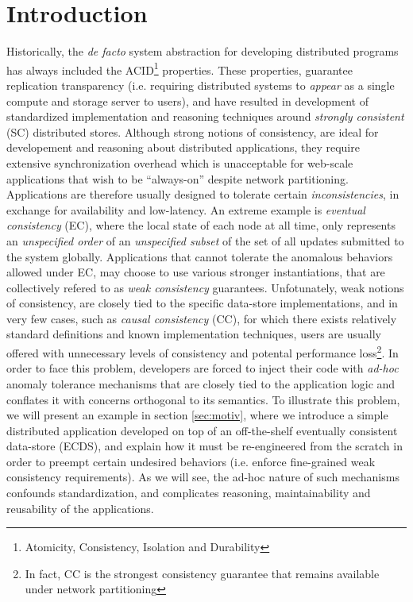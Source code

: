 \section{Introduction}
\label{sec:intro}
Historically,
the \emph{de facto} system abstraction for developing distributed
programs has always included the 
ACID\footnote{Atomicity, Consistency, Isolation and
Durability} properties.
These properties, guarantee replication transparency  (i.e. requiring distributed
systems to \emph{appear} as a single compute and storage server to
users), and have resulted in development of standardized implementation and
reasoning techniques around \emph{strongly consistent} (SC) distributed
stores.
Although strong notions of consistency, are ideal for developement and
reasoning about distributed applications, 
they require extensive synchronization overhead which is unacceptable
for web-scale applications that wish to be ``always-on'' despite network
partitioning. Applications are therefore usually designed to tolerate
certain \emph{inconsistencies}, in exchange for availability and
low-latency. 
An extreme example is \emph{eventual consistency} (EC), where
the local state of each node at all time,
only represents an \emph{unspecified order} of an \emph{unspecified
subset} of the set of all updates submitted to the system globally.
Applications that  cannot tolerate the anomalous behaviors allowed under
EC, may choose to use various stronger instantiations, that are
collectively refered to as \emph{weak consistency} guarantees. 
Unfotunately, weak notions of consistency, are closely tied to the 
specific data-store implementations, and in very few cases, such as 
\emph{causal consistency} (CC), for which there exists
relatively standard definitions and known implementation techniques,
users are usually offered with unnecessary levels of consistency and potental
performance loss\footnote{In fact, CC is the
strongest consistency guarantee that remains available under network
partitioning}. In order to face this problem, developers are forced to
inject their code with \emph{ad-hoc} anomaly tolerance mechanisms that are closely
tied to the application logic and conflates it with concerns orthogonal
to its semantics.
To illustrate this problem, we will present an example in section
\ref{sec:motiv}, where we introduce a simple distributed application
developed on top of an off-the-shelf eventually consistent data-store
(ECDS), and explain how it must be re-engineered from the scratch in
order to preempt certain undesired behaviors (i.e. enforce fine-grained
weak consistency requirements). As we will see, the ad-hoc
nature of such mechanisms confounds standardization, and complicates
reasoning, maintainability and reusability of the applications.

